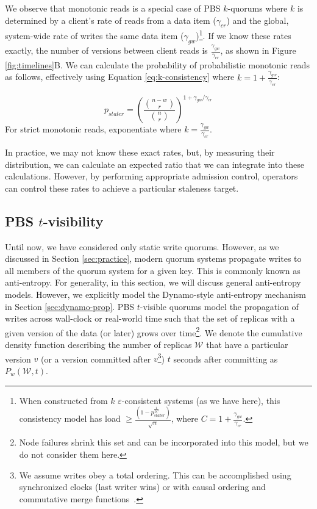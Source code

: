 \documentclass{vldb}
\begin{document}
We observe that monotonic reads is a special case of PBS
$k$-quorums where $k$ is determined by a client's rate of reads from a
data item ($\gamma_{cr}$) and the global, system-wide rate of writes
the same data item ($\gamma_{gw}$)\footnote{When constructed from $k$
  $\varepsilon$-consistent systems (as we have here), this consistency
  model has load $\geq
  \frac{(1-p_{staler}^{\frac{1}{2C}})}{\sqrt{n}}$, where
  $C=1+\frac{\gamma_{gw}}{\gamma_{cr}}$.}.  If we know these rates
exactly, the number of versions between client reads is
$\frac{\gamma_{gw}}{\gamma_{cr}}$, as shown in Figure
\ref{fig:timelines}B.  We can calculate the probability of
probabilistic monotonic reads as follows, effectively using Equation
\ref{eq:k-consistency} where $k=1+\frac{\gamma_{gw}}{\gamma_{cr}}$:

\begin{equation}
\label{eq:prob-mr}
p_{staler} = \left(\frac{{n-w \choose r}}{{n \choose r}}\right)^{1+\gamma_{gw}/\gamma_{cr}}
\end{equation}
For strict monotonic reads, exponentiate where $k=\frac{\gamma_{gw}}{\gamma_{cr}}$.

In practice, we may not know these exact rates, but, by measuring
their distribution, we can calculate an expected ratio that we can
integrate into these calculations.  However, by performing appropriate
admission control, operators can control these rates to achieve a
particular staleness target.

\subsection{PBS $t$-visibility}

Until now, we have considered only static write quorums.  However, as
we discussed in Section \ref{sec:practice}, modern quorum systems
propagate writes to all members of the quorum system for a given key.
This is commonly known as anti-entropy.  For generality, in this
section, we will discuss general anti-entropy models. However, we
explicitly model the Dynamo-style anti-entropy mechanism in Section
\ref{sec:dynamo-prop}.  PBS $t$-visible quorums model the
propagation of writes across wall-clock or real-world time such that
the set of replicas with a given version of the data (or later) grows
over time\footnote{Node failures shrink this set and can be
  incorporated into this model, but we do not consider them here.}.
We denote the cumulative density function describing the number of
replicas $\mathcal{W}$ that have a particular version $v$ (or a
version committed after $v$\footnote{We assume writes obey a total
  ordering. This can be accomplished using synchronized clocks (last
  writer wins) or with causal ordering and commutative merge
  functions~\cite{cops}.}) $t$ seconds after committing as
$P_w(\mathcal{W}, t)$.
\end{document}
